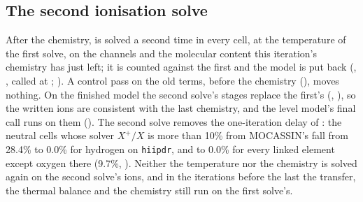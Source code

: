 \subsection{The second ionisation solve}

After the chemistry,  is solved a second time in every cell,
at the temperature of the first solve, on the channels and the molecular
content this iteration's chemistry has just left; it is counted against the
first and the model is put back (,
, called at ; ). A
control pass on the old terms, before the chemistry (), moves
nothing. On the finished model the second solve's stages replace the first's
(, ), so the written ions are consistent
with the last chemistry, and the level model's final call runs on them
(). The second solve removes the one-iteration delay of
: the neutral cells whose solver $X^+/X$ is more than 10\% from
MOCASSIN's fall from 28.4\% to 0.0\% for hydrogen on \texttt{hiipdr}, and to
0.0\% for every linked element except oxygen there (9.7\%, ). Neither
the temperature nor the chemistry is solved again on the second solve's ions,
and in the iterations before the last the transfer, the thermal balance and
the chemistry still run on the first solve's.
